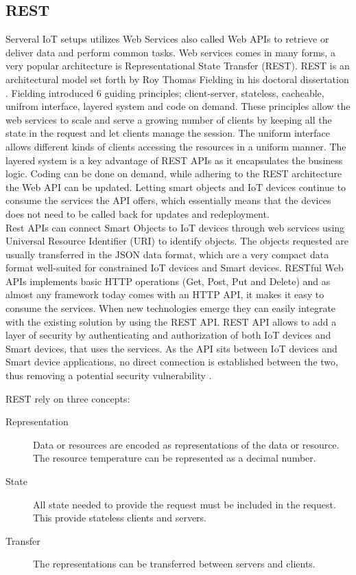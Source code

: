 \subsection{REST}
Serveral IoT setups utilizes Web Services also called Web APIs to retrieve or deliver data and perform common tasks. Web services comes in many forms, a very popular architecture is Representational State Transfer (REST). REST is an architectural model set forth by Roy Thomas Fielding in his doctoral dissertation \cite{Fielding}. Fielding introduced 6 guiding principles; client-server, stateless, cacheable, unifrom interface, layered system and code on demand. These principles allow the web services to scale and serve a growing number of clients by keeping all the state in the request and let clients manage the session. The uniform interface allows different kinds of clients accessing the resources in a uniform manner. The layered system is a key advantage of REST APIs as it encapsulates the business logic. Coding can be done on demand, while adhering to the REST architecture the Web API can be updated. Letting smart objects and IoT devices continue to consume the services the API offers, which essentially means that the devices does not need to be called back for updates and redeployment. \\

Rest APIs can connect Smart Objects to IoT devices through web services using Universal Resource Identifier (URI) to identify objects. The objects requested are usually transferred in the JSON data format, which are a very compact data format well-suited for constrained IoT devices and Smart devices. RESTful Web APIs implements basic HTTP operations (Get, Post, Put and Delete) and as almost any framework today comes with an HTTP API, it makes it easy to consume the services. When new technologies emerge they can easily integrate with the existing solution by using the REST API. REST API allows to add a layer of security by authenticating and authorization of both IoT devices and Smart devices, that uses the services. As the API sits between IoT devices and Smart device applications, no direct connection is established between the two, thus removing a potential security vulnerability \cite{Fielding}.

REST rely on three concepts: 
\begin{description}
    \item[Representation] Data or resources are encoded as representations of the data or resource. The resource temperature can be represented as a decimal number.
    \item[State] All state needed to provide the request must be included in the request. This provide stateless clients and servers. 
    \item[Transfer] The representations can be transferred between servers and clients.
    \cite{smartthings} 
\end{description} 
